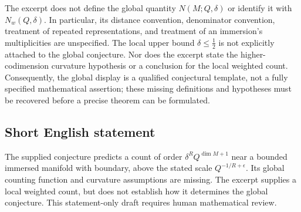 \documentclass[11pt]{article}
\begin{document}
The excerpt does not define the global quantity \(N(M;Q,\delta)\) or identify it with \(N_w(Q,\delta)\). In particular, its distance convention, denominator convention, treatment of repeated representations, and treatment of an immersion's multiplicities are unspecified. The local upper bound \(\delta\le\tfrac12\) is not explicitly attached to the global conjecture. Nor does the excerpt state the higher-codimension curvature hypothesis or a conclusion for the local weighted count. Consequently, the global display is a qualified conjectural template, not a fully specified mathematical assertion; these missing definitions and hypotheses must be recovered before a precise theorem can be formulated.
\subsection{Short English statement}
The supplied conjecture predicts a count of order \(\delta^R Q^{\dim M+1}\) near a bounded immersed manifold with boundary, above the stated scale \(Q^{-1/R+\epsilon}\). Its global counting function and curvature assumptions are missing. The excerpt supplies a local weighted count, but does not establish how it determines the global conjecture. This statement-only draft requires human mathematical review.
\end{document}
